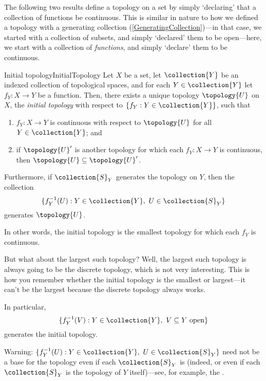 The following two results define a topology on a set by simply `declaring' that a collection of functions be continuous.  This is similar in nature to how we defined a topology with a generating collection (\cref{GeneratingCollection})---in that case, we started with a collection of subsets, and simply `declared' them to be open---here, we start with a collection of \emph{functions}, and simply `declare' them to be continuous.
\begin{prp}{Initial topology}{InitialTopology}
Let $X$ be a set, let $\collection{Y}$ be an indexed collection of topological spaces, and for each $Y\in \collection{Y}$ let $f_Y:X\rightarrow Y$ be a function.  Then, there exists a unique topology  $\topology{U}$ on $X$, the \emph{initial topology} with respect to $\{ f_Y:Y\in \collection{Y}\}$, such that
\begin{enumerate}
\item $f_Y:X\rightarrow Y$ is continuous with respect to $\topology{U}$ for all $Y\in \collection{Y}$; and
\item if $\topology{U}'$ is another topology for which each $f_Y:X\rightarrow Y$ is continuous, then $\topology{U}\subseteq \topology{U}'$.
\end{enumerate}
Furthermore, if $\collection{S}_Y$ generates the topology on $Y$, then the collection
\begin{equation}
\{ f_Y^{-1}(U):Y\in \collection{Y},\ U\in \collection{S}_Y\}
\end{equation}
generates $\topology{U}$.
\begin{rmk}
In other words, the initial topology is the smallest topology for which each $f_Y$ is continuous.
\end{rmk}
\begin{rmk}
But what about the largest such topology?  Well, the largest such topology is always going to be the discrete topology, which is not very interesting.  This is how you remember whether the initial topology is the smallest or largest---it can't be the largest because the discrete topology always works.
\end{rmk}
\begin{rmk}
In particular,
\begin{equation}
\{ f_Y^{-1}(V):Y\in \collection{Y},\ V\subseteq Y\text{ open}\}
\end{equation}
generates the initial topology.
\end{rmk}
\begin{wrn}
Warning:  $\{ f_Y^{-1}(U):Y\in \collection{Y},\ U\in \collection{S}_Y\}$ need not be a base for the topology even if each $\collection{S}_Y$ is (indeed, or even if each $\collection{S}_Y$ is the topology of $Y$ itself)---see, for example, the .

\end{wrn}
\end{prp}
